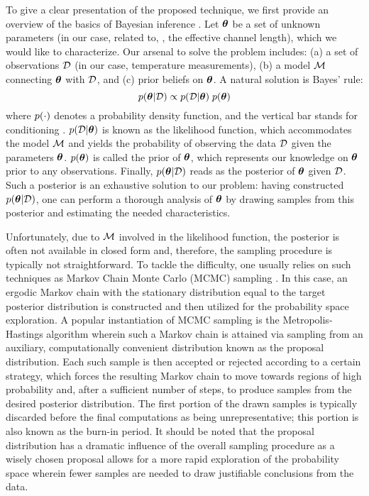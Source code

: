 To give a clear presentation of the proposed technique, we first provide an overview of the basics of Bayesian inference \cite{gelman2004}.
Let ${\boldsymbol\theta}$ be a set of unknown parameters (in our case, related to, \eg, the effective channel length), which we would like to characterize. Our arsenal to solve the problem includes: (a) a set of observations $\mathcal{D}$ (in our case, temperature measurements), (b) a model $\model$ connecting ${\boldsymbol\theta}$ with $\mathcal{D}$, and (c) prior beliefs on ${\boldsymbol\theta}$. A natural solution is Bayes' rule:
\begin{equation} \elabel{bayes}
  \f{\vparam | \Data} \propto \f{\Data | \vparam} \; \f{\vparam}
\end{equation}
where $\f{\cdot}$ denotes a probability density function, and the vertical bar stands for conditioning \cite{durrett2010}.
$\f{\Data | \vparam}$ is known as the likelihood function, which accommodates the model $\model$ and yields the probability of observing the data $\mathcal{D}$ given the parameters ${\boldsymbol\theta}$.
$\f{\vparam}$ is called the prior of ${\boldsymbol\theta}$, which represents our knowledge on ${\boldsymbol\theta}$ prior to any observations.
Finally, $\f{\vparam | \Data}$ reads as the posterior of ${\boldsymbol\theta}$ given $\mathcal{D}$. Such a posterior is an exhaustive solution to our problem: having constructed $\f{\vparam | \Data}$, one can perform a thorough analysis of ${\boldsymbol\theta}$ by drawing samples from this posterior and estimating the needed characteristics.

Unfortunately, due to $\model$ involved in the likelihood function, the posterior is often not available in closed form and, therefore, the sampling procedure is typically not straightforward.
To tackle the difficulty, one usually relies on such techniques as Markov Chain Monte Carlo (MCMC) sampling \cite{gelman2004}. In this case, an ergodic Markov chain with the stationary distribution equal to the target posterior distribution is constructed and then utilized for the probability space exploration.
A popular instantiation of MCMC sampling is the Metropolis-Hastings algorithm wherein such a Markov chain is attained via sampling from an auxiliary, computationally convenient distribution known as the proposal distribution.
Each such sample is then accepted or rejected according to a certain strategy, which forces the resulting Markov chain to move towards regions of high probability and, after a sufficient number of steps, to produce samples from the desired posterior distribution.
The first portion of the drawn samples is typically discarded before the final computations as being unrepresentative; this portion is also known as the burn-in period.
It should be noted that the proposal distribution has a dramatic influence of the overall sampling procedure as a wisely chosen proposal allows for a more rapid exploration of the probability space wherein fewer samples are needed to draw justifiable conclusions from the data.
